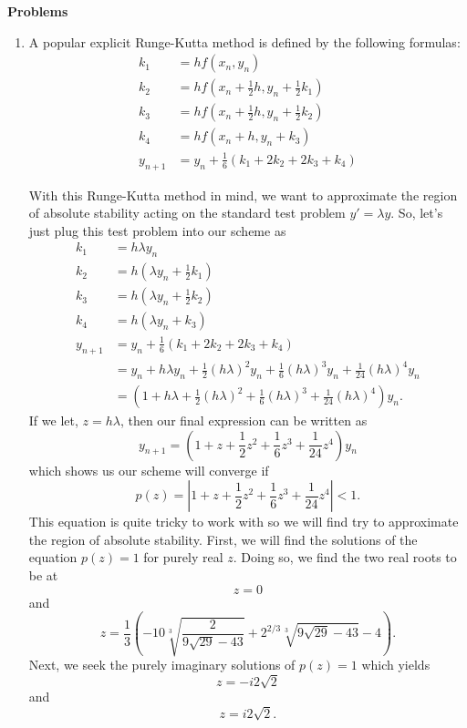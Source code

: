 \documentclass[a4paper,12pt]{article}
\newcommand{\abs}[1]{\left| #1 \right|}
\begin{document}
\textbf{Problems}
\begin{enumerate}[label = (\arabic*)]
	\item A popular explicit Runge-Kutta method is defined by the following formulas:
	\begin{align*}
		k_1 		 &= hf(x_n, y_n) \\
		k_2 		 &= hf(x_n + \frac{1}{2}h, y_n + \frac{1}{2} k_1) \\
		k_3 		 &= hf(x_n + \frac{1}{2}h, y_n + \frac{1}{2}k_2) \\
		k_4          &= hf(x_n + h, y_n + k_3) \\
		y_{n + 1} &= y_n + \frac{1}{6} (k_1 + 2k_2 + 2k_3 + k_4)
	\end{align*}
	
	With this Runge-Kutta method in mind, we want to approximate the region of absolute stability acting on the standard test problem $ y' = \lambda y $. So, let's just plug this test problem into our scheme as
	\begin{align*}
		k_1 		 &= h \lambda y_n \\
		k_2          &= h(\lambda y_n + \frac{1}{2} k_1) \\
		k_3 		 &= h(\lambda y_n + \frac{1}{2} k_2) \\
		k_4          &= h(\lambda y_n + k_3) \\
		y_{n + 1} &= y_n + \frac{1}{6} (k_1 + 2k_2 + 2k_3 + k_4) \\
						&= y_n + h \lambda y_n + \frac{1}{2} (h \lambda)^2 y_n + \frac{1}{6} (h \lambda)^3 y_n + \frac{1}{24} (h \lambda)^4 y_n \\
					    &= \left(1 + h \lambda + \frac{1}{2} (h \lambda)^2 + \frac{1}{6} (h \lambda)^3 + \frac{1}{24} (h \lambda)^4 \right) y_n.
	\end{align*}
	If we let, $ z = h \lambda $, then our final expression can be written as
	\[
		y_{n + 1} = \left(1 + z + \frac{1}{2} z^2 + \frac{1}{6} z^3 + \frac{1}{24} z^4 \right) y_n
	\]
	which shows us our scheme will converge if
	\[
		p(z) = \abs{1 + z + \frac{1}{2} z^2 + \frac{1}{6} z^3 + \frac{1}{24} z^4} < 1.
	\]
	This equation is quite tricky to work with so we will find try to approximate the region of absolute stability. First, we will find the solutions of the equation $ p(z) = 1$ for purely real $ z $. Doing so, we find the two real roots to be at
	\[
		z = 0
	\]
	and 
	\[
		z = \frac{1}{3} \left(-10 \sqrt[3]{\frac{2}{9 \sqrt{29}-43}}+2^{2/3} \sqrt[3]{9 \sqrt{29}-43}-4\right).
	\]
	Next, we seek the purely imaginary solutions of $ p(z) = 1 $ which yields
	\[
		z = - i 2 \sqrt{2}
	\]
	and 
	\[
		z = i 2 \sqrt{2}.
	\]
	

\end{enumerate}
\end{document}
